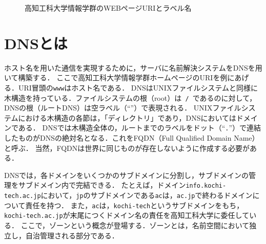 \begin{wrapfigure}{r}[0mm]{.5\textwidth}
      \centering
      \caption{高知工科大学情報学群のWEBページURIとラベル名}
      \label{fig:KUTINFOWebページ}
      
\end{wrapfigure}
\section{DNSとは}
ホスト名を用いた通信を実現するために，サーバに名前解決システムをDNSを用いて構築する．
ここで高知工科大学情報学群ホームページのURIを例にあげる．URI冒頭の\texttt{www}はホスト名である．
DNSはUNIXファイルシステムと同様に木構造を持っている．ファイルシステムの根（root）は\texttt{\ /\ }であるのに対して，DNSの根（ルートDNS）は空ラベル（``''）で表現される．
UNIXファイルシステムにおける木構造の各節は，「ディレクトリ」であり，DNSにおいてはドメインである．
DNSでは木構造全体の，ルートまでのラベルをドット（``\texttt{.}''）で連結したものがDNSの絶対名となる．これをFQDN（Full Qualified Domain Name）と呼ぶ．
当然，FQDNは世界に同じものが存在しないように作成する必要がある．\par
DNSでは，各ドメインをいくつかのサブドメインに分割し，サブドメインの管理をサブドメイン内で完結できる．
たとえば，ドメイン\texttt{info.kochi-tech.ac.jp}において，\texttt{jp}のサブドメインである\texttt{ac}は，\texttt{ac.jp}で終わるドメインについて責任を持つ．
また，\texttt{ac}は，\texttt{kochi-tech}というサブドメインをもち，\texttt{kochi-tech.ac.jp}が末尾につくドメイン名の責任を高知工科大学に委任している．
ここで，ゾーンという概念が登場する．ゾーンとは，名前空間において独立し，自治管理される部分である．